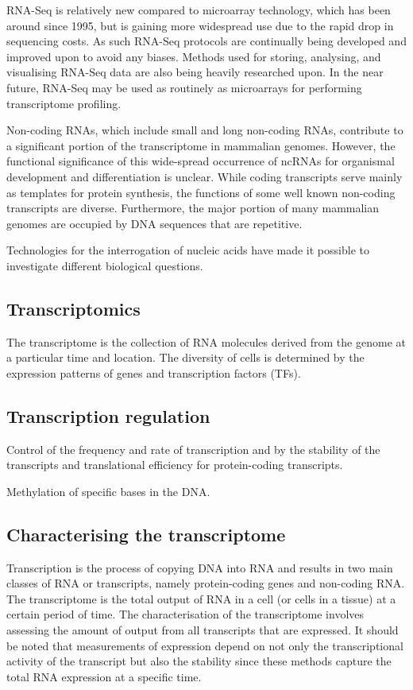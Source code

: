 RNA-Seq is relatively new compared to microarray technology, which has been around since 1995, but is gaining more widespread use due to the rapid drop in sequencing costs. As such RNA-Seq protocols are continually being developed and improved upon to avoid any biases. Methods used for storing, analysing, and visualising RNA-Seq data are also being heavily researched upon. In the near future, RNA-Seq may be used as routinely as microarrays for performing transcriptome profiling.

Non-coding RNAs, which include small and long non-coding RNAs, contribute to a significant portion of the transcriptome in mammalian genomes. However, the functional significance of this wide-spread occurrence of ncRNAs for organismal development and differentiation is unclear. While coding transcripts serve mainly as templates for protein synthesis, the functions of some well known non-coding transcripts are diverse. Furthermore, the major portion of many mammalian genomes are occupied by DNA sequences that are repetitive.

Technologies for the interrogation of nucleic acids have made it possible to investigate different biological questions.

\subsection{Transcriptomics}

The transcriptome is the collection of RNA molecules derived from the genome at a particular time and location. The diversity of cells is determined by the expression patterns of genes and transcription factors (TFs).


\subsection{Transcription regulation}

Control of the frequency and rate of transcription and by the stability of the transcripts and translational efficiency for protein-coding transcripts.

Methylation of specific bases in the DNA.

\subsection{Characterising the transcriptome}

Transcription is the process of copying DNA into RNA and results in two main classes of RNA or transcripts, namely protein-coding genes and non-coding RNA. The transcriptome is the total output of RNA in a cell (or cells in a tissue) at a certain period of time. The characterisation of the transcriptome involves assessing the amount of output from all transcripts that are expressed. It should be noted that measurements of expression depend on not only the transcriptional activity of the transcript but also the stability since these methods capture the total RNA expression at a specific time.

